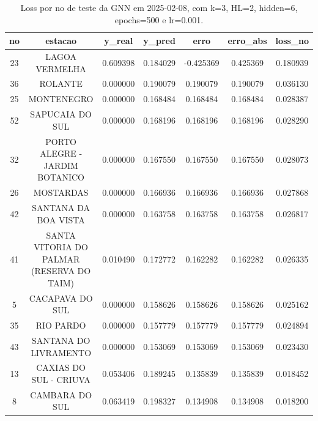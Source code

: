 \begin{table}[h]
\centering
\caption{Loss por no de teste da GNN em 2025-02-08, com k=3, HL=2, hidden=6, epochs=500 e lr=0.001.}
\label{tab:gnn_loss_k3_hl2_h6_e500_d20250208}
\begin{tabular}{ccccccc}
\toprule
no & estacao & y\_real & y\_pred & erro & erro\_abs & loss\_no \\
\midrule
23 & LAGOA VERMELHA & 0.609398 & 0.184029 & -0.425369 & 0.425369 & 0.180939 \\
36 & ROLANTE & 0.000000 & 0.190079 & 0.190079 & 0.190079 & 0.036130 \\
25 & MONTENEGRO & 0.000000 & 0.168484 & 0.168484 & 0.168484 & 0.028387 \\
52 & SAPUCAIA DO SUL & 0.000000 & 0.168196 & 0.168196 & 0.168196 & 0.028290 \\
32 & PORTO ALEGRE - JARDIM BOTANICO & 0.000000 & 0.167550 & 0.167550 & 0.167550 & 0.028073 \\
26 & MOSTARDAS & 0.000000 & 0.166936 & 0.166936 & 0.166936 & 0.027868 \\
42 & SANTANA DA BOA VISTA & 0.000000 & 0.163758 & 0.163758 & 0.163758 & 0.026817 \\
41 & SANTA VITORIA DO PALMAR (RESERVA DO TAIM) & 0.010490 & 0.172772 & 0.162282 & 0.162282 & 0.026335 \\
5 & CACAPAVA DO SUL & 0.000000 & 0.158626 & 0.158626 & 0.158626 & 0.025162 \\
35 & RIO PARDO & 0.000000 & 0.157779 & 0.157779 & 0.157779 & 0.024894 \\
43 & SANTANA DO LIVRAMENTO & 0.000000 & 0.153069 & 0.153069 & 0.153069 & 0.023430 \\
13 & CAXIAS DO SUL - CRIUVA & 0.053406 & 0.189245 & 0.135839 & 0.135839 & 0.018452 \\
8 & CAMBARA DO SUL & 0.063419 & 0.198327 & 0.134908 & 0.134908 & 0.018200 \\
\bottomrule
\end{tabular}
\end{table}
